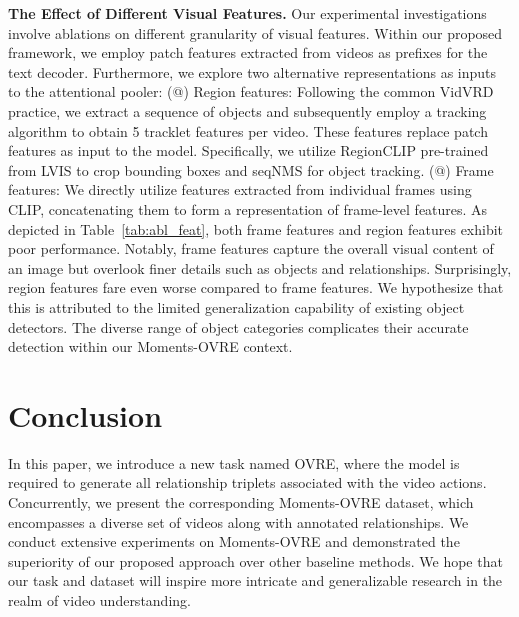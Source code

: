\documentclass[letterpaper]{article}
\makeatletter
\newcommand{\Rmnum}[1]{\expandafter\@slowromancap\romannumeral #1@}
\makeatother
\begin{document}
\noindent \textbf{The Effect of Different Visual Features.}
Our experimental investigations involve ablations on different granularity of visual features. Within our proposed framework, we employ patch features extracted from videos as prefixes for the text decoder. Furthermore, we explore two alternative representations as inputs to the attentional pooler:
\vspace{-1.66mm}
\vspace{-1.66mm}
\vspace{-1.66mm}
(\Rmnum{1}) Region features: Following the common VidVRD practice, we extract a sequence of objects and subsequently employ a tracking algorithm to obtain 5 tracklet features per video. These features replace patch features as input to the model. Specifically, we utilize RegionCLIP \cite{zhong2021regionclip} pre-trained from LVIS to crop bounding boxes and seqNMS \cite{han2016seqnms} for object tracking.
(\Rmnum{2}) Frame features: We directly utilize features extracted from individual frames using CLIP, concatenating them to form a representation of frame-level features.
As depicted in Table~\ref{tab:abl_feat}, both frame features and region features exhibit poor performance. Notably, frame features capture the overall visual content of an image but overlook finer details such as objects and relationships. Surprisingly, region features fare even worse compared to frame features. We hypothesize that this is attributed to the limited generalization capability of existing object detectors. The diverse range of object categories complicates their accurate detection within our Moments-OVRE context.



\vspace{-3.12mm}
\section{Conclusion}
In this paper, we introduce a new task named OVRE, where the model is required to generate all relationship triplets associated with the video actions. Concurrently, we present the corresponding Moments-OVRE dataset, which encompasses a diverse set of videos along with annotated relationships. We conduct extensive experiments on Moments-OVRE and demonstrated the superiority of our proposed approach over other baseline methods. We hope that our task and dataset will inspire more intricate and generalizable research in the realm of video understanding.

\hspace*{\fill}
\end{document}
